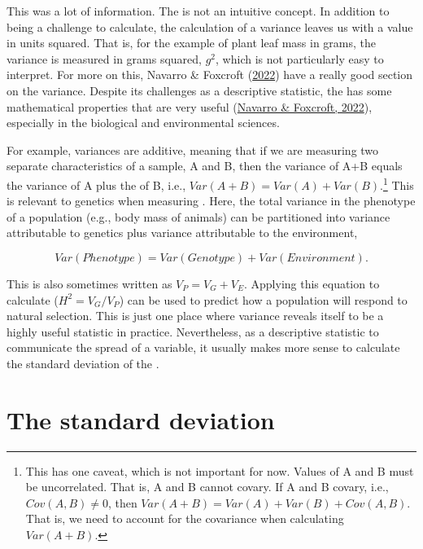 \documentclass[
  openany]{krantz}
\begin{document}
This was a lot of information.
The  is not an intuitive concept.
In addition to being a challenge to calculate, the calculation of a variance leaves us with a value in units squared.
That is, for the example of plant leaf mass in grams, the variance is measured in grams squared, \(g^{2}\), which is not particularly easy to interpret.
For more on this, Navarro \& Foxcroft (\protect\hyperlink{ref-Navarro2022}{2022}) have a really good section on the variance.
Despite its challenges as a descriptive statistic, the  has some mathematical properties that are very useful (\protect\hyperlink{ref-Navarro2022}{Navarro \& Foxcroft, 2022}), especially in the biological and environmental sciences.

For example, variances are additive, meaning that if we are measuring two separate characteristics of a sample, A and B, then the variance of A+B equals the variance of A plus the  of B, i.e., \(Var(A + B) = Var(A) + Var(B)\).\footnote{This has one caveat, which is not important for now. Values of A and B must be uncorrelated. That is, A and B cannot covary. If A and B covary, i.e., \(Cov(A, B) \neq 0\), then \(Var(A+B) = Var(A) + Var(B) + Cov(A, B)\). That is, we need to account for the covariance when calculating \(Var(A+B)\).}
This is relevant to genetics when measuring .
Here, the total variance in the phenotype of a population (e.g., body mass of animals) can be partitioned into variance attributable to genetics plus variance attributable to the environment,

\[Var(Phenotype) = Var(Genotype) + Var(Environment).\]

This is also sometimes written as \(V_{P} = V_{G} + V_{E}\).
Applying this equation to calculate  (\(H^{2} = V_{G} / V_{P}\)) can be used to predict how a population will respond to natural selection.
This is just one place where variance reveals itself to be a highly useful statistic in practice.
Nevertheless, as a descriptive statistic to communicate the spread of a variable, it usually makes more sense to calculate the standard deviation of the .

\hypertarget{the-standard-deviation}{%
\section{The standard deviation}\label{the-standard-deviation}}
\end{document}
